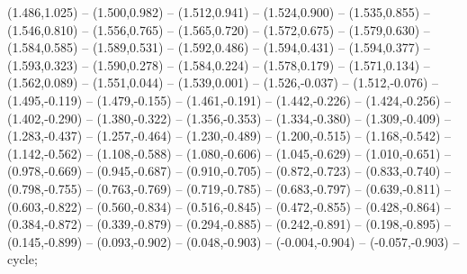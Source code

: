 (1.486,1.025) -- (1.500,0.982) -- (1.512,0.941) -- (1.524,0.900) -- (1.535,0.855) -- (1.546,0.810) -- (1.556,0.765) -- (1.565,0.720) -- (1.572,0.675) -- (1.579,0.630) -- (1.584,0.585) -- (1.589,0.531) -- (1.592,0.486) -- (1.594,0.431) -- (1.594,0.377) -- (1.593,0.323) -- (1.590,0.278) -- (1.584,0.224) -- (1.578,0.179) -- (1.571,0.134) -- (1.562,0.089) -- (1.551,0.044) -- (1.539,0.001) -- (1.526,-0.037) -- (1.512,-0.076) -- (1.495,-0.119) -- (1.479,-0.155) -- (1.461,-0.191) -- (1.442,-0.226) -- (1.424,-0.256) -- (1.402,-0.290) -- (1.380,-0.322) -- (1.356,-0.353) -- (1.334,-0.380) -- (1.309,-0.409) -- (1.283,-0.437) -- (1.257,-0.464) -- (1.230,-0.489) -- (1.200,-0.515) -- (1.168,-0.542) -- (1.142,-0.562) -- (1.108,-0.588) -- (1.080,-0.606) -- (1.045,-0.629) -- (1.010,-0.651) -- (0.978,-0.669) -- (0.945,-0.687) -- (0.910,-0.705) -- (0.872,-0.723) -- (0.833,-0.740) -- (0.798,-0.755) -- (0.763,-0.769) -- (0.719,-0.785) -- (0.683,-0.797) -- (0.639,-0.811) -- (0.603,-0.822) -- (0.560,-0.834) -- (0.516,-0.845) -- (0.472,-0.855) -- (0.428,-0.864) -- (0.384,-0.872) -- (0.339,-0.879) -- (0.294,-0.885) -- (0.242,-0.891) -- (0.198,-0.895) -- (0.145,-0.899) -- (0.093,-0.902) -- (0.048,-0.903) -- (-0.004,-0.904) -- (-0.057,-0.903) -- cycle;
